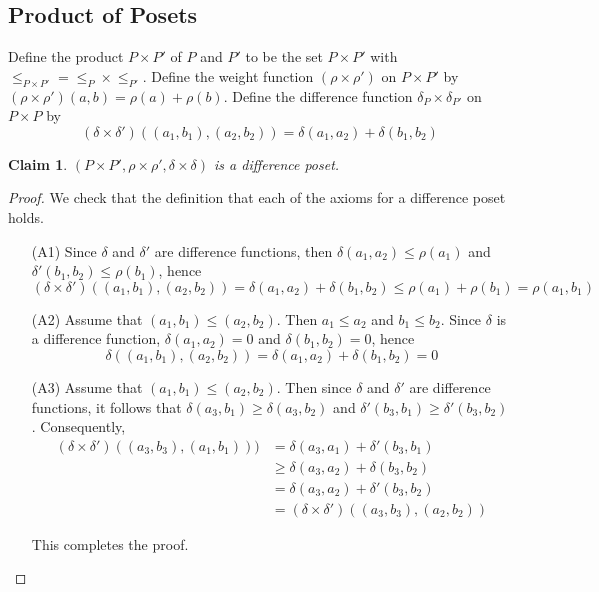 \documentclass[acmsmall,review,anonymous]{acmart}\settopmatter{printfolios=true,printccs=false,printacmref=false}
\newtheorem{claim}{Claim}
\begin{document}
\subsection{Product of Posets}
Define the product $P \times P'$ of $P$ and $P'$ to be the set $P \times P'$
with $\leq_{P \times P'} = \leq_P \times \leq_{P'}$. Define the weight function
$(\rho \times \rho')$ on $P \times P'$ by $(\rho \times \rho')(a, b) = \rho(a)
+ \rho(b)$. Define the difference function $\delta_P \times \delta_{P'}$ on $P
\times P$ by $$(\delta \times \delta')((a_1, b_1), (a_2, b_2)) = \delta(a_1,
a_2) + \delta(b_1, b_2)$$
\begin{claim}
$(P \times P', \rho \times \rho', \delta \times \delta)$ is a difference poset.
\end{claim}
\begin{proof}
We check that the definition that each of the axioms for a difference poset
holds.
\begin{enumerate}
  \item[(A1)]
  Since $\delta$ and $\delta'$ are difference functions, then $\delta(a_1, a_2)
  \leq \rho(a_1)$ and $\delta'(b_1, b_2) \leq \rho(b_1)$, hence $$
  (\delta \times \delta')((a_1, b_1), (a_2, b_2)) = \delta(a_1, a_2) +
  \delta(b_1, b_2) \leq \rho(a_1) + \rho(b_1) = \rho(a_1, b_1)$$
  \item[(A2)]
  Assume that $(a_1, b_1) \leq (a_2, b_2)$. Then $a_1 \leq a_2$ and $b_1 \leq
  b_2$. Since $\delta$ is a difference function, $\delta(a_1, a_2) = 0$ and
  $\delta(b_1, b_2) = 0$, hence
  $$\delta((a_1, b_1), (a_2, b_2)) = \delta(a_1, a_2) + \delta(b_1, b_2) = 0$$
  \item[(A3)]
  Assume that $(a_1, b_1) \leq (a_2, b_2)$. Then since $\delta$ and $\delta'$
  are difference functions, it follows that $\delta(a_3, b_1)
  \geq \delta(a_3, b_2)$ and $\delta'(b_3, b_1) \geq \delta'(b_3, b_2)$.
  Consequently,
  \begin{align*}
(\delta \times \delta')((a_3, b_3), (a_1, b_1)))
&=\delta(a_3, a_1) + \delta'(b_3, b_1)\\
&\geq \delta(a_3, a_2) + \delta(b_3, b_2)\\
&= \delta(a_3, a_2) + \delta'(b_3, b_2)\\
&= (\delta \times \delta')((a_3, b_3), (a_2, b_2))
\end{align*}

This completes the proof.
\end{enumerate}
\end{proof}
\end{document}

